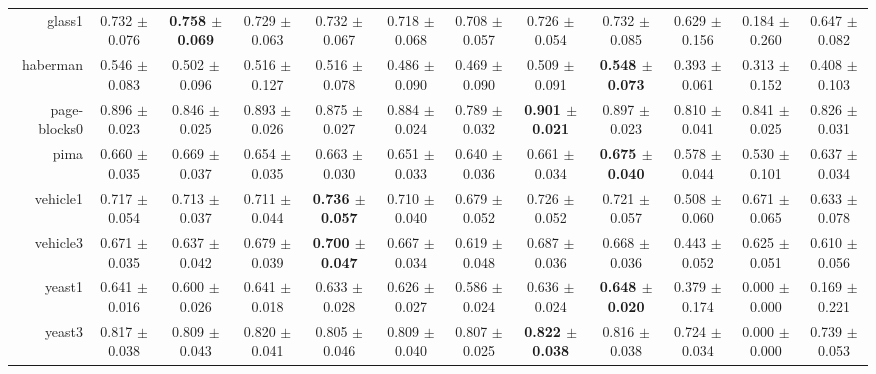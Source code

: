 \begin{table}[!ht]
{\begin{tabular}{r c c c c c c c c c c c}
glass1 & 0.732 $\pm$ 0.076 & \textbf{0.758 $\pm$ 0.069} & 0.729 $\pm$ 0.063 & 0.732 $\pm$ 0.067 & 0.718 $\pm$ 0.068 & 0.708 $\pm$ 0.057 & 0.726 $\pm$ 0.054 & 0.732 $\pm$ 0.085 & 0.629 $\pm$ 0.156 & 0.184 $\pm$ 0.260 & 0.647 $\pm$ 0.082 \\
haberman & 0.546 $\pm$ 0.083 & 0.502 $\pm$ 0.096 & 0.516 $\pm$ 0.127 & 0.516 $\pm$ 0.078 & 0.486 $\pm$ 0.090 & 0.469 $\pm$ 0.090 & 0.509 $\pm$ 0.091 & \textbf{0.548 $\pm$ 0.073} & 0.393 $\pm$ 0.061 & 0.313 $\pm$ 0.152 & 0.408 $\pm$ 0.103 \\
page-blocks0 & 0.896 $\pm$ 0.023 & 0.846 $\pm$ 0.025 & 0.893 $\pm$ 0.026 & 0.875 $\pm$ 0.027 & 0.884 $\pm$ 0.024 & 0.789 $\pm$ 0.032 & \textbf{0.901 $\pm$ 0.021} & 0.897 $\pm$ 0.023 & 0.810 $\pm$ 0.041 & 0.841 $\pm$ 0.025 & 0.826 $\pm$ 0.031 \\
pima & 0.660 $\pm$ 0.035 & 0.669 $\pm$ 0.037 & 0.654 $\pm$ 0.035 & 0.663 $\pm$ 0.030 & 0.651 $\pm$ 0.033 & 0.640 $\pm$ 0.036 & 0.661 $\pm$ 0.034 & \textbf{0.675 $\pm$ 0.040} & 0.578 $\pm$ 0.044 & 0.530 $\pm$ 0.101 & 0.637 $\pm$ 0.034 \\
vehicle1 & 0.717 $\pm$ 0.054 & 0.713 $\pm$ 0.037 & 0.711 $\pm$ 0.044 & \textbf{0.736 $\pm$ 0.057} & 0.710 $\pm$ 0.040 & 0.679 $\pm$ 0.052 & 0.726 $\pm$ 0.052 & 0.721 $\pm$ 0.057 & 0.508 $\pm$ 0.060 & 0.671 $\pm$ 0.065 & 0.633 $\pm$ 0.078 \\
vehicle3 & 0.671 $\pm$ 0.035 & 0.637 $\pm$ 0.042 & 0.679 $\pm$ 0.039 & \textbf{0.700 $\pm$ 0.047} & 0.667 $\pm$ 0.034 & 0.619 $\pm$ 0.048 & 0.687 $\pm$ 0.036 & 0.668 $\pm$ 0.036 & 0.443 $\pm$ 0.052 & 0.625 $\pm$ 0.051 & 0.610 $\pm$ 0.056 \\
yeast1 & 0.641 $\pm$ 0.016 & 0.600 $\pm$ 0.026 & 0.641 $\pm$ 0.018 & 0.633 $\pm$ 0.028 & 0.626 $\pm$ 0.027 & 0.586 $\pm$ 0.024 & 0.636 $\pm$ 0.024 & \textbf{0.648 $\pm$ 0.020} & 0.379 $\pm$ 0.174 & 0.000 $\pm$ 0.000 & 0.169 $\pm$ 0.221 \\
yeast3 & 0.817 $\pm$ 0.038 & 0.809 $\pm$ 0.043 & 0.820 $\pm$ 0.041 & 0.805 $\pm$ 0.046 & 0.809 $\pm$ 0.040 & 0.807 $\pm$ 0.025 & \textbf{0.822 $\pm$ 0.038} & 0.816 $\pm$ 0.038 & 0.724 $\pm$ 0.034 & 0.000 $\pm$ 0.000 & 0.739 $\pm$ 0.053 \\
\end{tabular}}
\end{table}
